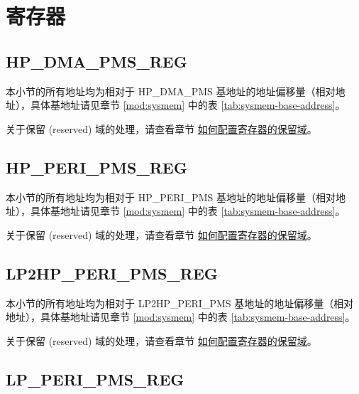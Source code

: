 \documentclass[main\_\_CN.tex]{subfiles}
\begin{document}

\clearpage
\section{寄存器}

\subsection{HP\_DMA\_PMS\_REG}

本小节的所有地址均为相对于 HP\_DMA\_PMS 基地址的地址偏移量（相对地址），具体基地址请见章节 \ref{mod:sysmem} \textit{} 中的表 \ref{tab:sysmem-base-address}。

关于保留 (reserved) 域的处理，请查看章节 \hyperref[programming-reserved-field]{如何配置寄存器的保留域}。



\subsection{HP\_PERI\_PMS\_REG}

本小节的所有地址均为相对于 HP\_PERI\_PMS 基地址的地址偏移量（相对地址），具体基地址请见章节 \ref{mod:sysmem} \textit{} 中的表 \ref{tab:sysmem-base-address}。

关于保留 (reserved) 域的处理，请查看章节 \hyperref[programming-reserved-field]{如何配置寄存器的保留域}。



\subsection{LP2HP\_PERI\_PMS\_REG}

本小节的所有地址均为相对于 LP2HP\_PERI\_PMS 基地址的地址偏移量（相对地址），具体基地址请见章节 \ref{mod:sysmem} \textit{} 中的表 \ref{tab:sysmem-base-address}。

关于保留 (reserved) 域的处理，请查看章节 \hyperref[programming-reserved-field]{如何配置寄存器的保留域}。



\subsection{LP\_PERI\_PMS\_REG}
\end{document}
